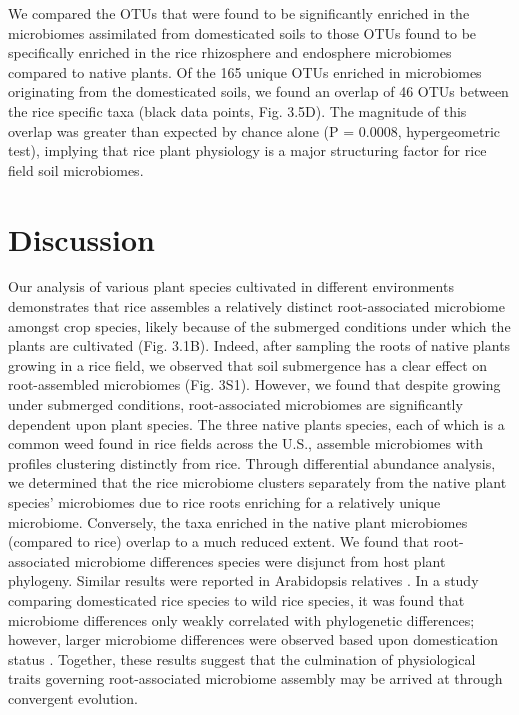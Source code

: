 We compared the OTUs that were found to be significantly enriched in the microbiomes assimilated from domesticated soils to those OTUs found to be specifically enriched in the rice rhizosphere and endosphere microbiomes compared to native plants. Of the 165 unique OTUs enriched in microbiomes originating from the domesticated soils, we found an overlap of 46 OTUs between the rice specific taxa (black data points, Fig. 3.5D). The magnitude of this overlap was greater than expected by chance alone (P = 0.0008, hypergeometric test), implying that rice plant physiology is a major structuring factor for rice field soil microbiomes.

\section{Discussion}
Our analysis of various plant species cultivated in different environments demonstrates that rice assembles a relatively distinct root-associated microbiome amongst crop species, likely because of the submerged conditions under which the plants are cultivated (Fig. 3.1B). Indeed, after sampling the roots of native plants growing in a rice field, we observed that soil submergence has a clear effect on root-assembled microbiomes (Fig. 3S1). However, we found that despite growing under submerged conditions, root-associated microbiomes are significantly dependent upon plant species. The three native plants species, each of which is a common weed found in rice fields across the U.S., assemble microbiomes with profiles clustering distinctly from rice. Through differential abundance analysis, we determined that the rice microbiome clusters separately from the native plant species' microbiomes due to rice roots enriching for a relatively unique microbiome. Conversely, the taxa enriched in the native plant microbiomes (compared to rice) overlap to a much reduced extent. We found that root-associated microbiome differences species were disjunct from host plant phylogeny. Similar results were reported in Arabidopsis relatives \cite{Schlaeppi2014}. In a study comparing domesticated rice species to wild rice species, it was found that microbiome differences only weakly correlated with phylogenetic differences; however, larger microbiome differences were observed based upon domestication status \cite{Shenton2016}. Together, these results suggest that the culmination of physiological traits governing root-associated microbiome assembly may be arrived at through convergent evolution. 

